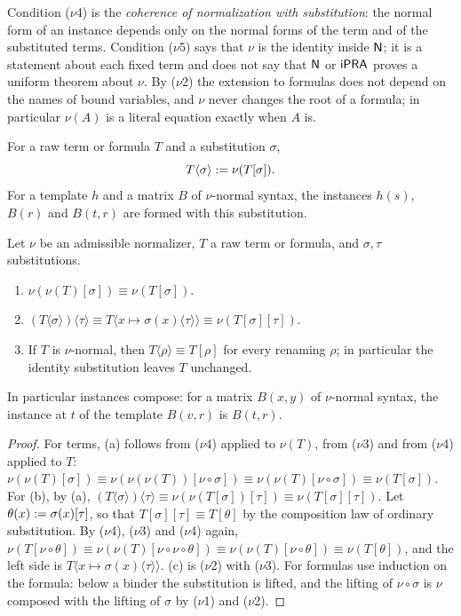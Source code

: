 Condition ($\nu$4) is the \emph{coherence of normalization with
substitution}: the normal form of an instance depends only on the normal
forms of the term and of the substituted terms. Condition ($\nu$5) says that
$\nu$ is the identity inside $\mathsf{N}$; it is a statement about each fixed term
and does not say that $\mathsf{N}$ or $\mathsf{iPRA}$ proves a uniform theorem about
$\nu$. By ($\nu$2) the extension to formulas does not depend on the names of
bound variables, and $\nu$ never changes the root of a formula; in
particular $\nu(A)$ is a literal equation exactly when $A$ is.

\begin{definition}
\label{comp:def:nusubst}
For a raw term or formula $T$ and a substitution $\sigma$,
\[
 T\langle\sigma\rangle\mathrel{:=}\nu(T[\sigma]).
\]
For a template $h$ and a matrix $B$ of $\nu$-normal syntax, the instances
$h(s)$, $B(r)$ and $B(t,r)$ are formed with this substitution.
\end{definition}

\begin{lemma}
\label{comp:lem:laws}
Let $\nu$ be an admissible normalizer, $T$ a raw term or formula, and
$\sigma,\tau$ substitutions.
\begin{enumerate}[label=(\alph*)]
\item $\nu(\nu(T)[\sigma])\equiv\nu(T[\sigma])$.
\item $(T\langle\sigma\rangle)\langle\tau\rangle\equiv
 T\langle x\mapsto\sigma(x)\langle\tau\rangle\rangle\equiv
 \nu(T[\sigma][\tau])$.
\item If $T$ is $\nu$-normal, then $T\langle\rho\rangle\equiv T[\rho]$ for
 every renaming $\rho$; in particular the identity substitution leaves $T$
 unchanged.
\end{enumerate}
In particular instances compose: for a matrix $B(x,y)$ of $\nu$-normal
syntax, the instance at $t$ of the template $B(v,r)$ is $B(t,r)$.
\end{lemma}

\begin{proof}
For terms, (a) follows from ($\nu$4) applied to $\nu(T)$, from ($\nu$3) and
from ($\nu$4) applied to $T$:
$\nu(\nu(T)[\sigma])\equiv\nu(\nu(\nu(T))[\nu\circ\sigma])\equiv
\nu(\nu(T)[\nu\circ\sigma])\equiv\nu(T[\sigma])$. For (b), by (a),
$(T\langle\sigma\rangle)\langle\tau\rangle\equiv\nu(\nu(T[\sigma])[\tau])
\equiv\nu(T[\sigma][\tau])$. Let $\theta(x)\mathrel{:=}\sigma(x)[\tau]$, so that
$T[\sigma][\tau]\equiv T[\theta]$ by the composition law of ordinary
substitution. By ($\nu$4), ($\nu$3) and ($\nu$4) again,
$\nu(T[\nu\circ\theta])\equiv\nu(\nu(T)[\nu\circ\nu\circ\theta])\equiv
\nu(\nu(T)[\nu\circ\theta])\equiv\nu(T[\theta])$, and the left side is
$T\langle x\mapsto\sigma(x)\langle\tau\rangle\rangle$. (c) is ($\nu$2) with
($\nu$3). For formulas use induction on the formula: below a binder the
substitution is lifted, and the lifting of $\nu\circ\sigma$ is $\nu$ composed
with the lifting of $\sigma$ by ($\nu$1) and ($\nu$2).
\end{proof}

